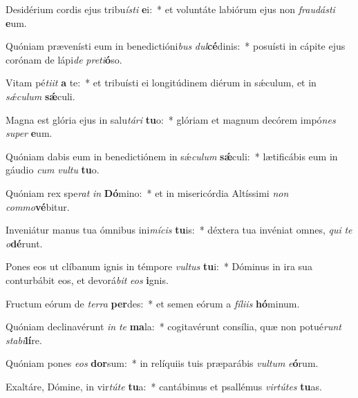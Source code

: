 \item Desidérium cordis ejus tribu\textit{ís}\textit{ti} \textbf{e}i:~* et voluntáte labiórum ejus non \textit{frau}\textit{dás}\textit{ti} \textbf{e}um.
\item Quóniam prævenísti eum in benedictióni\textit{bus} \textit{dul}\textbf{cé}dinis:~* posuísti in cápite ejus corónam de lápi\textit{de} \textit{pre}\textit{ti}\textbf{ó}so.
\item Vitam pé\textit{ti}\textit{it} \textbf{a} te:~* et tribuísti ei longitúdinem diérum in sǽculum, et in \textit{sǽ}\textit{cu}\textit{lum} \textbf{sǽ}culi.
\item Magna est glória ejus in salu\textit{tá}\textit{ri} \textbf{tu}o:~* glóriam et magnum decórem impó\textit{nes} \textit{su}\textit{per} \textbf{e}um.
\item Quóniam dabis eum in benedictiónem in sǽ\textit{cu}\textit{lum} \textbf{sǽ}culi:~* lætificábis eum in gáudio \textit{cum} \textit{vul}\textit{tu} \textbf{tu}o.
\item Quóniam rex spe\textit{rat} \textit{in} \textbf{Dó}mino:~* et in misericórdia Altíssimi \textit{non} \textit{com}\textit{mo}\textbf{vé}bitur.
\item Inveniátur manus tua ómnibus ini\textit{mí}\textit{cis} \textbf{tu}is:~* déxtera tua invéniat omnes, \textit{qui} \textit{te} \textit{o}\textbf{dé}runt.
\item Pones eos ut clíbanum ignis in témpore \textit{vul}\textit{tus} \textbf{tu}i:~* Dóminus in ira sua conturbábit eos, et devorá\textit{bit} \textit{e}\textit{os} \textbf{i}gnis.
\item Fructum eórum de \textit{ter}\textit{ra} \textbf{per}des:~* et semen eórum a \textit{fí}\textit{li}\textit{is} \textbf{hó}minum.
\item Quóniam declinavérunt \textit{in} \textit{te} \textbf{ma}la:~* cogitavérunt consília, quæ non potué\textit{runt} \textit{sta}\textit{bi}\textbf{lí}re.
\item Quóniam pones \textit{e}\textit{os} \textbf{dor}sum:~* in relíquiis tuis præparábis \textit{vul}\textit{tum} \textit{e}\textbf{ó}rum.
\item Exaltáre, Dómine, in vir\textit{tú}\textit{te} \textbf{tu}a:~* cantábimus et psallémus \textit{vir}\textit{tú}\textit{tes} \textbf{tu}as.
